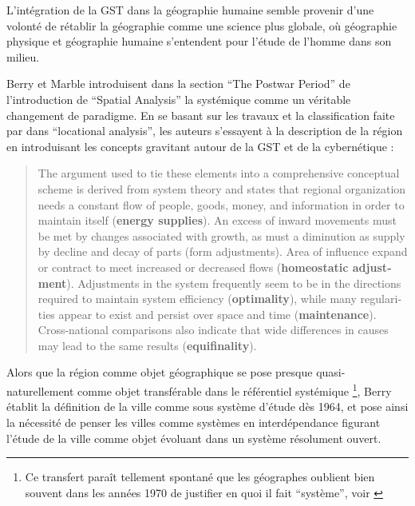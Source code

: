 L'intégration de la GST dans la géographie humaine semble provenir d'une volonté de rétablir la géographie comme une science plus globale, où géographie physique et géographie humaine s'entendent pour l'étude de l'homme dans son milieu.

Berry et Marble introduisent dans la section \foreignquote{english}{The Postwar Period} de l'introduction de \foreignquote{english}{Spatial Analysis} \autocite{Berry1968} la systémique comme un véritable changement de paradigme. En se basant sur les travaux et la classification faite par \textcite{Haggett1965} dans \foreignquote{english}{locational analysis}, les auteurs s'essayent à la description de la région en introduisant les concepts gravitant autour de la GST et de la cybernétique : 

\foreignblockquote{english}{The argument used to tie these elements into a comprehensive conceptual scheme is derived from system theory and states that regional organization needs a constant flow of people, goods, money, and information in order to maintain itself (\textbf{energy supplies}). An excess of inward movements must be met by changes associated with growth, as must a diminution as supply by decline and decay of parts (form adjustments). Area of influence expand or contract to meet increased or decreased flows (\textbf{homeostatic adjustment}). Adjustments in the system frequently seem to be in the directions required to maintain system efficiency (\textbf{optimality}), while many regularities appear to exist and persist over space and time (\textbf{maintenance}). Cross-national comparisons also indicate that wide differences in causes may lead to the same results (\textbf{equifinality}).}

Alors que la région comme objet géographique se pose presque quasi-naturellement comme objet transférable dans le référentiel systémique \footnote{Ce transfert paraît tellement spontané que les géographes oublient bien souvent dans les années 1970 de justifier en quoi il fait \enquote{système}, voir \autocite{Orain2001}}, Berry établit la définition de la ville comme sous système d'étude dès 1964, et pose ainsi la nécessité de penser les villes comme systèmes en interdépendance figurant l'étude de la ville comme objet évoluant dans un système résolument ouvert.

